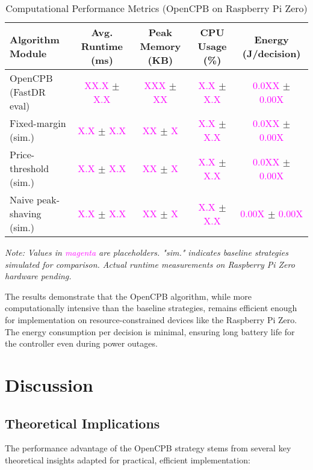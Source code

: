 \documentclass[11pt,a4paper]{article}
\begin{document}
\begin{table}[ht]
\centering
\caption{Computational Performance Metrics (OpenCPB on Raspberry Pi Zero)}
\label{tab:computational}
\begin{tabular}{lcccc}
\toprule
\textbf{Algorithm Module} & \textbf{Avg. Runtime (ms)} & \textbf{Peak Memory (KB)} & \textbf{CPU Usage (\%)} & \textbf{Energy (J/decision)} \\
\midrule
OpenCPB (FastDR eval) & \textcolor{magenta}{XX.X} $\pm$ \textcolor{magenta}{X.X} & \textcolor{magenta}{XXX} $\pm$ \textcolor{magenta}{XX} & \textcolor{magenta}{X.X} $\pm$ \textcolor{magenta}{X.X} & \textcolor{magenta}{0.0XX} $\pm$ \textcolor{magenta}{0.00X} \\
Fixed-margin (sim.) & \textcolor{magenta}{X.X} $\pm$ \textcolor{magenta}{X.X} & \textcolor{magenta}{XX} $\pm$ \textcolor{magenta}{X} & \textcolor{magenta}{X.X} $\pm$ \textcolor{magenta}{X.X} & \textcolor{magenta}{0.0XX} $\pm$ \textcolor{magenta}{0.00X} \\
Price-threshold (sim.) & \textcolor{magenta}{X.X} $\pm$ \textcolor{magenta}{X.X} & \textcolor{magenta}{XX} $\pm$ \textcolor{magenta}{X} & \textcolor{magenta}{X.X} $\pm$ \textcolor{magenta}{X.X} & \textcolor{magenta}{0.0XX} $\pm$ \textcolor{magenta}{0.00X} \\
Naive peak-shaving (sim.) & \textcolor{magenta}{X.X} $\pm$ \textcolor{magenta}{X.X} & \textcolor{magenta}{XX} $\pm$ \textcolor{magenta}{X} & \textcolor{magenta}{X.X} $\pm$ \textcolor{magenta}{X.X} & \textcolor{magenta}{0.00X} $\pm$ \textcolor{magenta}{0.00X} \\
\bottomrule
\end{tabular}
\end{table}
\footnotesize{\textit{Note: Values in \textcolor{magenta}{magenta} are placeholders. "sim." indicates baseline strategies simulated for comparison. Actual runtime measurements on Raspberry Pi Zero hardware pending.}}

The results demonstrate that the OpenCPB algorithm, while more computationally intensive than the baseline strategies, remains efficient enough for implementation on resource-constrained devices like the Raspberry Pi Zero. The energy consumption per decision is minimal, ensuring long battery life for the controller even during power outages.

\section{Discussion}
\subsection{Theoretical Implications}
The performance advantage of the OpenCPB strategy stems from several key theoretical insights adapted for practical, efficient implementation:
\end{document}
